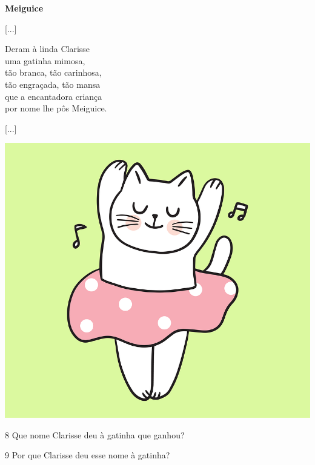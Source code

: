 \begin{minipage}{.5\textwidth}
\textbf{Meiguice}


{[}...{]}

Deram à linda Clarisse\\
uma gatinha mimosa,\\
tão branca, tão carinhosa,\\
tão engraçada, tão mansa\\
que a encantadora criança\\
por nome lhe pôs Meiguice.

{[}...{]}
\end{minipage}
\begin{minipage}{.5\textwidth}
\includegraphics[width=\textwidth]{./media/image23.png}
\end{minipage}



\num{8} Que nome Clarisse deu à gatinha que ganhou?


\num{9} Por que Clarisse deu esse nome à gatinha?


